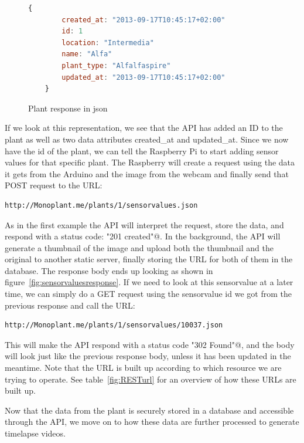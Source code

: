 \begin{figure}
	\begin{lstlisting}[language=javascript]
	{
		created_at: "2013-09-17T10:45:17+02:00"
		id: 1
		location: "Intermedia"
		name: "Alfa"
		plant_type: "Alfalfaspire"
		updated_at: "2013-09-17T10:45:17+02:00"
	}
	\end{lstlisting}
	\caption{Plant response in json}
	\label{fig:plantresponse}
\end{figure}

If we look at this representation, we see that the API has added an ID to the plant as well as two data attributes created\_at and updated\_at. Since we now have the id of the plant, we can tell the Raspberry Pi to start adding sensor values for that specific plant. The Raspberry will create a request using the data it gets from the Arduino and the image from the webcam and finally send that POST request to the URL:\begin{verbatim}http://Monoplant.me/plants/1/sensorvalues.json \end{verbatim}

As in the first example the API will interpret the request, store the data, and respond with a status code: \verb@"201 created"@. In the background, the API will generate a thumbnail of the image and upload both the thumbnail and the original to another static server, finally storing the URL for both of them in the database. The response body ends up looking as shown in figure~\ref{fig:sensorvaluesresponse}. If we need to look at this sensorvalue at a later time, we can simply do a GET request using the sensorvalue id we got from the previous response and call the URL:\begin{verbatim}http://Monoplant.me/plants/1/sensorvalues/10037.json \end{verbatim} This will make the API respond with a status code \verb@"302 Found"@, and the body will look just like the previous response body, unless it has been updated in the meantime. Note that the URL is built up according to which resource we are trying to operate. See table~\ref{fig:RESTurl} for an overview of how these URLs are built up.

Now that the data from the plant is securely stored in a database and accessible through the API, we move on to how these data are further processed to generate timelapse videos. 

